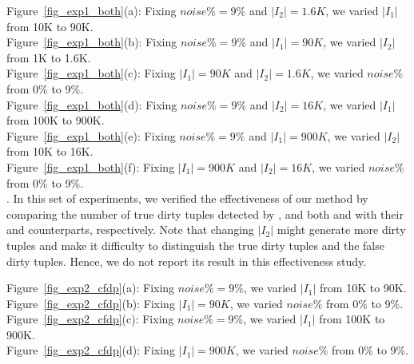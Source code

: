 \noindent Figure~\ref{fig_exp1_both}(a): Fixing $noise\% = 9\%$ and $|I_2| = 1.6K$, we varied $|I_1|$ from 10K to 90K.\\
Figure~\ref{fig_exp1_both}(b): Fixing $noise\% = 9\%$ and $|I_1| = 90K$, we varied $|I_2|$ from 1K to 1.6K.\\
Figure~\ref{fig_exp1_both}(c): Fixing $|I_1| = 90K$ and $|I_2| = 1.6K$, we varied $noise\%$ from 0\% to 9\%.\\
Figure~\ref{fig_exp1_both}(d): Fixing $noise\% = 9\%$ and $|I_2| = 16K$, we varied $|I_1|$ from 100K to 900K.\\
Figure~\ref{fig_exp1_both}(e): Fixing $noise\% = 9\%$ and $|I_1| = 900K$, we varied $|I_2|$ from 10K to 16K.\\
Figure~\ref{fig_exp1_both}(f): Fixing $|I_1| = 900K$ and $|I_2| = 16K$, we varied $noise\%$ from 0\% to 9\%.\\




. In this set of experiments, we verified the effectiveness of our method by comparing the number of true dirty tuples detected by \pCFDs, \pCINDs and both \pCFDs and \pCINDs with their \CFDs and \CINDs counterparts, respectively. Note that changing $|I_{2}|$ might generate more dirty tuples and make it difficulty to distinguish the true dirty tuples and the false dirty tuples. Hence, we do not report its result in this effectiveness study.

\begin{figure*}
  \centering
  \centering
  \quad
  \quad
  \quad
  \caption{Effectiveness of detecting \pCFD violations}\label{fig_exp2_cfdp}
\end{figure*}

\noindent Figure~\ref{fig_exp2_cfdp}(a): Fixing $noise\% = 9\%$, we varied $|I_1|$ from 10K to 90K.    \\
Figure~\ref{fig_exp2_cfdp}(b): Fixing $|I_1|=90K$, we varied $noise\%$ from 0\% to 9\%.\\
Figure~\ref{fig_exp2_cfdp}(c): Fixing $noise\% = 9\%$, we varied $|I_1|$ from 100K to 900K.  \\
Figure~\ref{fig_exp2_cfdp}(d): Fixing $|I_1|=900K$, we varied $noise\%$ from 0\% to 9\%.  \\


